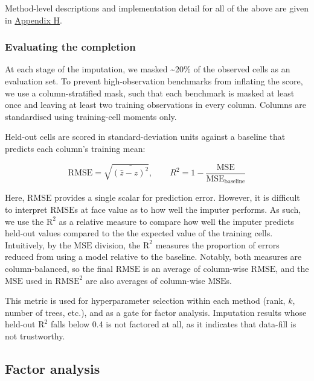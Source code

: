 \documentclass{article} %
\begin{document}
Method-level descriptions and implementation detail for all of the above are given in \href{Appendix-Methods\#H\%20Completion\%20methods}{Appendix H}.

\hypertarget{evaluating-the-completion}{%
\subsubsection{Evaluating the completion}\label{evaluating-the-completion}}

At each stage of the imputation, we masked \textasciitilde20\% of the observed cells as an evaluation set. To prevent high-observation benchmarks from inflating the score, we use a column-stratified
mask, such that each benchmark is masked at least once and leaving at least two training observations in every column. Columns are standardised using training-cell moments only.

Held-out cells are scored in standard-deviation units against a baseline that predicts each column's training mean:

\[\text{RMSE} = \sqrt{\overline{(\hat z - z)^2}}, \qquad R^2 = 1 - \frac{\text{MSE}}{\text{MSE}_{\text{baseline}}}\]

Here, \(\text{RMSE}\) provides a single scalar for prediction error. However, it is difficult to interpret \(\text{RMSE}\)s at face value as to how well the imputer performs. As such, we use the
\(\text{R}^2\) as a relative measure to compare how well the imputer predicts held-out values compared to the the expected value of the training cells. Intuitively, by the \(\text{MSE}\) division, the
\(\text{R}^2\) measures the proportion of errors reduced from using a model relative to the baseline. Notably, both measures are column-balanced, so the final \(\text{RMSE}\) is an average of
column-wise \(\text{RMSE}\), and the \(\text{MSE}\) used in \(\text{RMSE}^2\) are also averages of column-wise \(\text{MSE}\)s.

This metric is used for hyperparameter selection within each method (rank, \(k\), number of trees, etc.), and as a gate for factor analysis. Imputation results whose held-out \(\text{R}^2\) falls
below 0.4 is not factored at all, as it indicates that data-fill is not trustworthy.

\hypertarget{factor-analysis}{%
\subsection{Factor analysis}\label{factor-analysis}}
\end{document}
